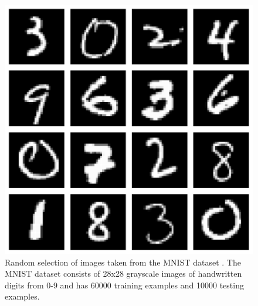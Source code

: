 \begin{figure}[!htb]
    \centering
      \includegraphics[width=.6\linewidth]{images/mnist.pdf}
      \caption{Random selection of images taken from the MNIST dataset \cite{bib:mnist}. The MNIST dataset consists of 28x28 grayscale images of handwritten digits from 0-9 and has 60000 training examples and 10000 testing examples.}
\label{fig:mnist}
\end{figure}
\FloatBarrier

